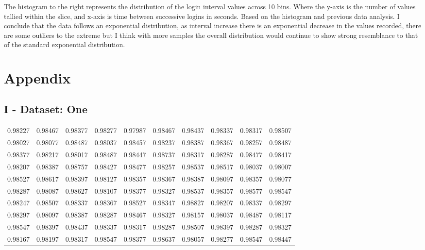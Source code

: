 \documentclass[10pt]{report}
\begin{document}
The histogram to the right represents the distribution of the login interval values across 10 bins.
Where the y-axis is the number of values tallied within the slice, and x-axis is time between successive logins
in seconds.
Based on the histogram and previous data analysis. I conclude that the data follows an exponential distribution, as
interval increase there is an exponential decrease in the values recorded, there are some outliers to the extreme but
I think with more samples the overall distribution would continue to show strong resemblance to that of the standard
exponential distribution.


\newpage
\section*{Appendix}

\subsection*{I - Dataset: One}

\begin{tabular}{rrrrrrrrrr}
    \hline
     0.98227 & 0.98467 & 0.98377 & 0.98277 & 0.97987 & 0.98467 & 0.98437 & 0.98337 & 0.98317 & 0.98507 \\
      0.98027 & 0.98077 & 0.98487 & 0.98037 & 0.98457 & 0.98237 & 0.98387 & 0.98367 & 0.98257 & 0.98487 \\
       0.98377 & 0.98217 & 0.98017 & 0.98487 & 0.98447 & 0.98737 & 0.98317 & 0.98287 & 0.98477 & 0.98417 \\
        0.98207 & 0.98387 & 0.98757 & 0.98427 & 0.98477 & 0.98257 & 0.98537 & 0.98517 & 0.98037 & 0.98007 \\
         0.98527 & 0.98617 & 0.98397 & 0.98127 & 0.98357 & 0.98367 & 0.98387 & 0.98097 & 0.98357 & 0.98077 \\
          0.98287 & 0.98087 & 0.98627 & 0.98107 & 0.98377 & 0.98327 & 0.98537 & 0.98357 & 0.98577 & 0.98547 \\
           0.98247 & 0.98507 & 0.98337 & 0.98367 & 0.98527 & 0.98347 & 0.98827 & 0.98207 & 0.98337 & 0.98297 \\
            0.98297 & 0.98097 & 0.98387 & 0.98287 & 0.98467 & 0.98327 & 0.98157 & 0.98037 & 0.98487 & 0.98117 \\
             0.98547 & 0.98397 & 0.98437 & 0.98337 & 0.98317 & 0.98287 & 0.98507 & 0.98397 & 0.98287 & 0.98327 \\
              0.98167 & 0.98197 & 0.98317 & 0.98547 & 0.98377 & 0.98637 & 0.98057 & 0.98277 & 0.98547 & 0.98447 \\
              \hline
\end{tabular}
\end{document}
